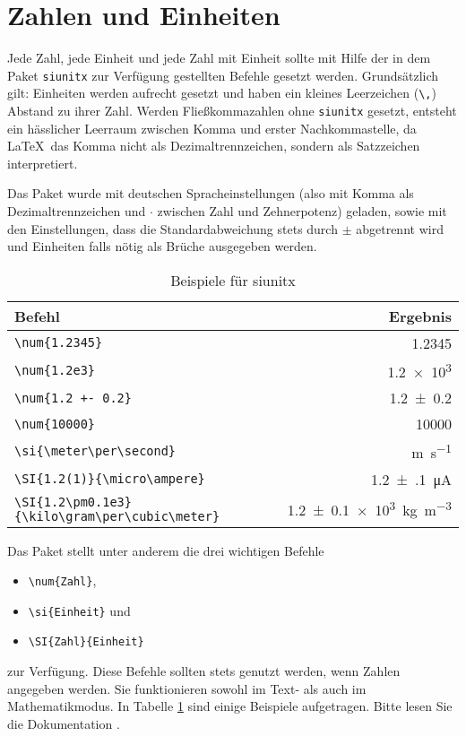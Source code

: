 \section{Zahlen und Einheiten}

Jede Zahl, jede Einheit und jede Zahl mit Einheit sollte mit Hilfe der in dem Paket \texttt{siunitx} zur Verfügung gestellten Befehle gesetzt werden.
Grundsätzlich gilt: Einheiten werden aufrecht gesetzt und haben ein kleines Leerzeichen (\verb+\,+) Abstand zu ihrer Zahl.
Werden Fließkommazahlen ohne \texttt{siunitx} gesetzt, entsteht ein hässlicher Leerraum zwischen Komma und erster Nachkommastelle, da \LaTeX \ das Komma nicht als Dezimaltrennzeichen, sondern als Satzzeichen interpretiert.

Das Paket wurde mit deutschen Spracheinstellungen (also mit Komma als Dezimaltrennzeichen und $\cdot$ zwischen Zahl und Zehnerpotenz) geladen, sowie mit den Einstellungen, dass die Standardabweichung stets durch $\pm$ abgetrennt wird und Einheiten falls nötig als Brüche ausgegeben werden.

\begin{table}
    \centering
    \caption{Beispiele für siunitx}
    \label{tab:si}
    \begin{tabular}{l r}
        \toprule
        Befehl     &   Ergebnis \\
        \midrule
        \verb+\num{1.2345}+ & \num{1.2345} \\
        \verb+\num{1.2e3}+ & \num{1.2e3} \\
        \verb_\num{1.2 +- 0.2}_ & \num{1.2+-0.2} \\
        \verb+\num{10000}+ & \num{10000} \\
        \verb+\si{\meter\per\second}+ & \si{\meter\per\second} \\
        \verb+\SI{1.2(1)}{\micro\ampere}+ & \SI{1.2(1)}{\micro\ampere} \\
        \verb+\SI{1.2\pm0.1e3}{\kilo\gram\per\cubic\meter}+ & \SI{1.2\pm0.1e3}{\kilo\gram\per\cubic\meter} \\
        \bottomrule
    \end{tabular}
\end{table}

Das Paket stellt unter anderem die drei wichtigen Befehle
\begin{itemize}
    \item \texttt{\textbackslash num\{Zahl\}},
    \item \texttt{\textbackslash si\{Einheit\}} und
    \item \texttt{\textbackslash SI\{Zahl\}\{Einheit\}}
\end{itemize}
zur Verfügung.
Diese Befehle sollten stets genutzt werden, wenn Zahlen angegeben werden.
Sie funktionieren sowohl im Text- als auch im Mathematikmodus.
In Tabelle \ref{tab:si} sind einige Beispiele aufgetragen. Bitte lesen Sie die Dokumentation \cite{siunitx}.

